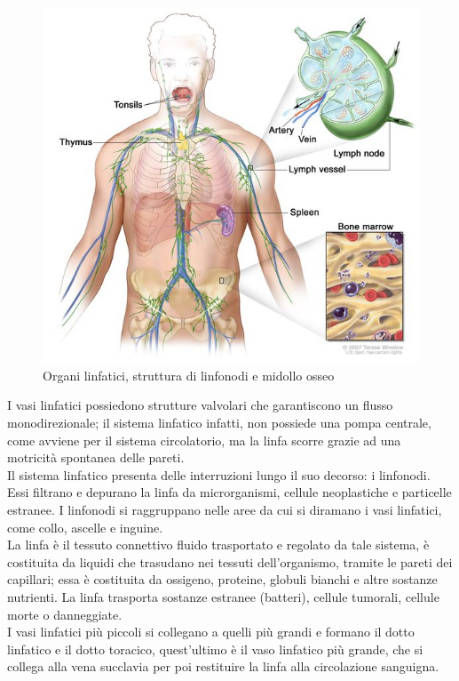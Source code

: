 \begin{figure}[H]
    \begin{center}
    \includegraphics[width=0.5\columnwidth]{img/anatomy.jpeg}
    \vspace{-3mm}
    \end{center}
    \caption{Organi linfatici, struttura di linfonodi e midollo osseo
    \cite{img2}}
    \label{fig:FIGURE_1.2}
\end{figure}

I vasi linfatici possiedono strutture valvolari che garantiscono un flusso monodirezionale; 
il sistema linfatico infatti, non possiede una pompa centrale, 
come avviene per il sistema circolatorio, ma la linfa scorre grazie ad una motricità spontanea delle pareti.\\
Il sistema linfatico presenta delle interruzioni lungo il suo decorso: i linfonodi. 
Essi filtrano e depurano la linfa da microrganismi, cellule neoplastiche e particelle estranee\cite{BOOK1}. 
I linfonodi si raggruppano nelle aree da cui si diramano i vasi linfatici, come collo, ascelle e inguine.\\
La linfa è il tessuto connettivo fluido trasportato e regolato da tale sistema, è costituita 
da liquidi che trasudano nei tessuti dell'organismo, tramite le pareti dei capillari; essa è costituita 
da ossigeno, proteine, globuli bianchi e altre sostanze nutrienti\cite{BOOK1}. 
La linfa trasporta sostanze estranee (batteri), cellule tumorali, cellule morte o danneggiate.\\ 
I vasi linfatici più piccoli si collegano a quelli più grandi e formano il dotto linfatico e il dotto 
toracico, quest'ultimo è il vaso linfatico più grande, che si collega alla vena succlavia per poi restituire 
la linfa alla circolazione sanguigna\cite{BOOK1}.

